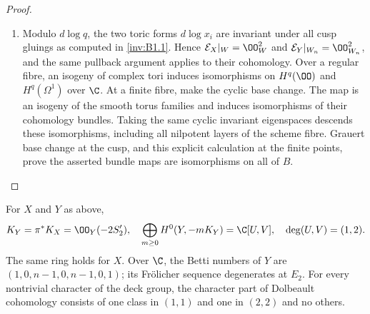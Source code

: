 \begin{proof}
\begin{enumerate}[label=\arabic*.,leftmargin=*]
\item Modulo $d\log q$, the two toric forms $d\log x_i$ are invariant
under all cusp gluings as computed in \ref{inv:B1.1}. Hence
$\mathcal E_X|_W=\OO_W^2$ and $\mathcal E_Y|_{W_n}=\OO_{W_n}^2$,
and the same pullback argument applies to their cohomology.
Over a regular fibre, an isogeny of complex tori induces isomorphisms
on $H^q(\OO)$ and $H^q(\Omega^1)$ over $\C$.
At a finite fibre, make the cyclic base change. The map is an isogeny
of the smooth torus families and induces isomorphisms of their
cohomology bundles. Taking the same cyclic invariant eigenspaces
descends these isomorphisms, including all nilpotent layers of the
scheme fibre. Grauert base change at the cusp, and this explicit
calculation at the finite points, prove the asserted bundle maps are
isomorphisms on all of $B$.
\end{enumerate}
\end{proof}

\begin{proposition}\hypertarget{tag-01S9}{}\label{inv:B3.3}

For $X$ and $Y$ as above,
\[
K_Y=\pi^*K_X=\OO_Y(-2S'_2),\quad
\bigoplus_{m\ge0}H^0(Y,-mK_Y)=\C[U,V],\quad
\deg(U,V)=(1,2).
\]
The same ring holds for $X$.
Over $\C$, the Betti numbers of $Y$ are
$(1,0,n-1,0,n-1,0,1)$; its Fr\"olicher sequence degenerates at $E_2$.
For every nontrivial character of the deck group, the character
part of Dolbeault cohomology consists of one class in $(1,1)$ and
one in $(2,2)$ and no others.
\end{proposition}


